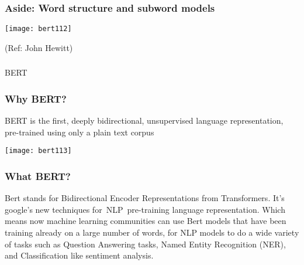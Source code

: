 \begin{frame}[fragile]\frametitle{Aside: Word structure and subword models}

			\begin{center}
			\texttt{[image: bert112]}
			\end{center}		
			
			{\tiny (Ref: John Hewitt)}

\end{frame}

\begin{frame}[fragile]\frametitle{}
\begin{center}
{\Large BERT}
\end{center}
\end{frame}

\begin{frame}[fragile]\frametitle{Why BERT?}

BERT is the first, deeply bidirectional, unsupervised language representation, pre-trained using only a plain text corpus

			\begin{center}
			\texttt{[image: bert113]}
			\end{center}		
			

\end{frame}

\begin{frame}[fragile]\frametitle{What BERT?}


			\begin{center}
Bert stands for Bidirectional Encoder Representations from Transformers. It’s google’s new techniques for NLP pre-training language representation. Which means now machine learning communities can use Bert models that have been training already on a large number of words, for NLP models to do a wide variety of tasks such as Question Answering tasks, Named Entity Recognition (NER), and Classification like sentiment analysis.
			\end{center}		
			

\end{frame}

